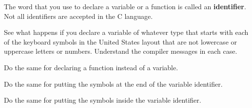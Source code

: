 
The word that you use to declare a variable or a function is called an \textbf{identifier}.
Not all identifiers are accepted in the C language.

See what happens if you declare a variable of whatever type
that starts with each of the keyboard symbols in the United States layout
that are not lowercase or uppercase letters or numbers.
Understand the compiler messages in each case.

Do the same for declaring a function instead of a variable.

Do the same for putting the symbols at the end of the variable identifier.

Do the same for putting the symbols inside the variable identifier.
